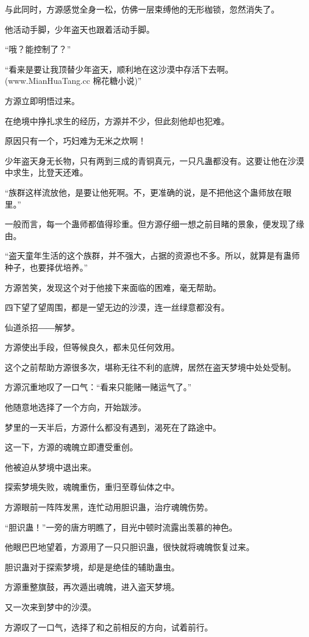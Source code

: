 \begin{this_body}
与此同时，方源感觉全身一松，仿佛一层束缚他的无形枷锁，忽然消失了。

他活动手脚，少年盗天也跟着活动手脚。

“哦？能控制了？”

“看来是要让我顶替少年盗天，顺利地在这沙漠中存活下去啊。(www.MianHuaTang.cc 棉花糖小说)”

方源立即明悟过来。

在绝境中挣扎求生的经历，方源并不少，但此刻他却也犯难。

原因只有一个，巧妇难为无米之炊啊！

少年盗天身无长物，只有两到三成的青铜真元，一只凡蛊都没有。这要让他在沙漠中求生，比登天还难。

“族群这样流放他，是要让他死啊。不，更准确的说，是不把他这个蛊师放在眼里。”

一般而言，每一个蛊师都值得珍重。但方源仔细一想之前目睹的景象，便发现了缘由。

“盗天童年生活的这个族群，并不强大，占据的资源也不多。所以，就算是有蛊师种子，也要择优培养。”

方源苦笑，发现这个对于他接下来面临的困难，毫无帮助。

四下望了望周围，都是一望无边的沙漠，连一丝绿意都没有。

仙道杀招――解梦。

方源使出手段，但等候良久，都未见任何效用。

这个之前帮助方源很多次，堪称无往不利的底牌，居然在盗天梦境中处处受制。

方源沉重地叹了一口气：“看来只能赌一赌运气了。”

他随意地选择了一个方向，开始跋涉。

梦里的一天半后，方源什么都没有遇到，渴死在了路途中。

这一下，方源的魂魄立即遭受重创。

他被迫从梦境中退出来。

探索梦境失败，魂魄重伤，重归至尊仙体之中。

方源眼前一阵阵发黑，连忙动用胆识蛊，治疗魂魄伤势。

“胆识蛊！”一旁的唐方明瞧了，目光中顿时流露出羡慕的神色。

他眼巴巴地望着，方源用了一只只胆识蛊，很快就将魂魄恢复过来。

胆识蛊对于探索梦境，却是是绝佳的辅助蛊虫。

方源重整旗鼓，再次遁出魂魄，进入盗天梦境。

又一次来到梦中的沙漠。

方源叹了一口气，选择了和之前相反的方向，试着前行。


\end{this_body}
